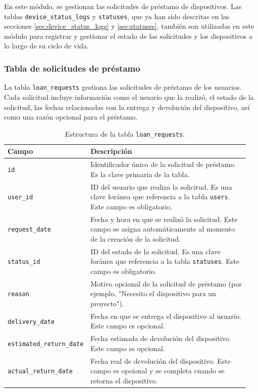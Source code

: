 En este módulo, se gestionan las solicitudes de préstamo de dispositivos. Las tablas \texttt{device\_status\_logs} y \texttt{statuses}, que ya han sido descritas en las secciones \ref{sec:device_status_logs} y \ref{sec:statuses}, también son utilizadas en este módulo para registrar y gestionar el estado de las solicitudes y los dispositivos a lo largo de su ciclo de vida.

\subsubsection*{Tabla de solicitudes de préstamo}

La tabla \texttt{loan\_requests} gestiona las solicitudes de préstamo de los usuarios. Cada solicitud incluye información como el usuario que la realizó, el estado de la solicitud, las fechas relacionadas con la entrega y devolución del dispositivo, así como una razón opcional para el préstamo.

\begin{table}[H]
  \centering
  \begin{tabular}{|p{0.25\linewidth}|p{0.7\linewidth}|}
    \hline
    \textbf{Campo} & \textbf{Descripción} \\
    \hline
    \texttt{id} & Identificador único de la solicitud de préstamo. Es la clave primaria de la tabla. \\
    \hline
    \texttt{user\_id} & ID del usuario que realiza la solicitud. Es una clave foránea que referencia a la tabla \texttt{users}. Este campo es obligatorio. \\
    \hline
    \texttt{request\_date} & Fecha y hora en que se realizó la solicitud. Este campo se asigna automáticamente al momento de la creación de la solicitud. \\
    \hline
    \texttt{status\_id} & ID del estado de la solicitud. Es una clave foránea que referencia a la tabla \texttt{statuses}. Este campo es obligatorio. \\
    \hline
    \texttt{reason} & Motivo opcional de la solicitud de préstamo (por ejemplo, "Necesito el dispositivo para un proyecto"). \\
    \hline
    \texttt{delivery\_date} & Fecha en que se entrega el dispositivo al usuario. Este campo es opcional. \\
    \hline
    \texttt{estimated\_return\_date} & Fecha estimada de devolución del dispositivo. Este campo es opcional. \\
    \hline
    \texttt{actual\_return\_date} & Fecha real de devolución del dispositivo. Este campo es opcional y se completa cuando se retorna el dispositivo. \\
    \hline
  \end{tabular}
  \caption{Estructura de la tabla \texttt{loan\_requests}.}
  \label{tab:tabla_loan_requests}
\end{table}

